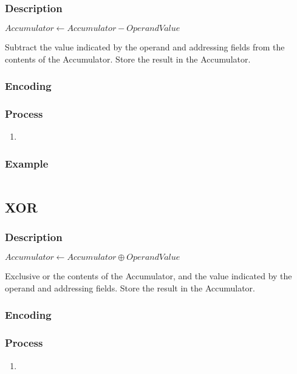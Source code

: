     \subsubsection{Description}
    $Accumulator \leftarrow Accumulator - OperandValue$
    \par Subtract the value indicated by the operand and addressing fields from the contents of the Accumulator.
    Store the result in the Accumulator.

    \subsubsection{Encoding}
    \subsubsection{Process}
    \begin{enumerate}
        \item
    \end{enumerate}

    \subsubsection{Example}
    \begin{verbatim}
    \end{verbatim}

\subsection{XOR}\label{subsec:xor}
    \subsubsection{Description}
    $Accumulator \leftarrow Accumulator \oplus OperandValue$
    \par Exclusive or the contents of the Accumulator, and the value indicated by the operand and addressing fields.
    Store the result in the Accumulator.

    \subsubsection{Encoding}
    \subsubsection{Process}
    \begin{enumerate}
        \item
    \end{enumerate}

